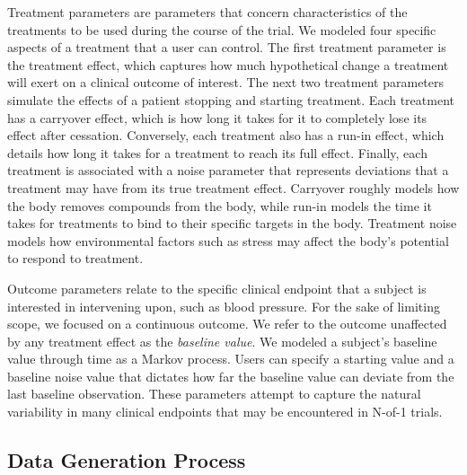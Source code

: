 \documentclass[11pt,]{article}
\begin{document}
Treatment parameters are parameters that concern characteristics of the
treatments to be used during the course of the trial. We modeled four
specific aspects of a treatment that a user can control. The first
treatment parameter is the treatment effect, which captures how much
hypothetical change a treatment will exert on a clinical outcome of
interest. The next two treatment parameters simulate the effects of a
patient stopping and starting treatment. Each treatment has a carryover
effect, which is how long it takes for it to completely lose its effect
after cessation. Conversely, each treatment also has a run-in effect,
which details how long it takes for a treatment to reach its full
effect. Finally, each treatment is associated with a noise parameter
that represents deviations that a treatment may have from its true
treatment effect. Carryover roughly models how the body removes
compounds from the body, while run-in models the time it takes for
treatments to bind to their specific targets in the body. Treatment
noise models how environmental factors such as stress may affect the
body's potential to respond to treatment.

Outcome parameters relate to the specific clinical endpoint that a
subject is interested in intervening upon, such as blood pressure. For
the sake of limiting scope, we focused on a continuous outcome. We refer
to the outcome unaffected by any treatment effect as the \emph{baseline
value}. We modeled a subject's baseline value through time as a Markov
process. Users can specify a starting value and a baseline noise value
that dictates how far the baseline value can deviate from the last
baseline observation. These parameters attempt to capture the natural
variability in many clinical endpoints that may be encountered in N-of-1
trials.

\subsection{Data Generation Process}\label{data-generation-process}
\end{document}
